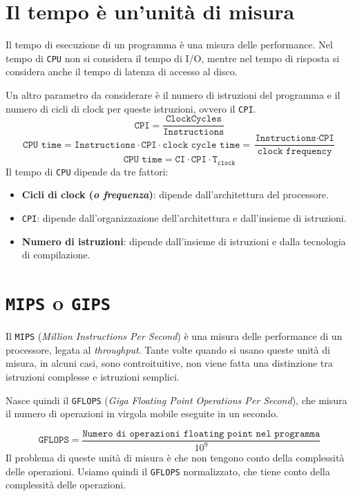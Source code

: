 \section{Il tempo è un'unità di misura}
Il tempo di esecuzione di un programma è una misura
delle performance. 
Nel tempo di \texttt{CPU} non si considera il tempo di
I/O, mentre nel tempo di risposta si considera anche il 
tempo di latenza di accesso al disco.

Un altro parametro da considerare è il numero di istruzioni
del programma e il numero di cicli di clock per queste istruzioni,
ovvero il \texttt{CPI}.
\[
  \texttt{CPI} = \frac{\texttt{ClockCycles}}{\texttt{Instructions}}  
\]
\[
  \texttt{CPU time} = \texttt{Instructions} \cdot \texttt{CPI} \cdot \texttt{clock cycle time}
  = \frac{\texttt{Instructions} \cdot \texttt{CPI}}{\texttt{clock frequency}}
\]
\[
  \texttt{CPU time} = \texttt{CI} \cdot \texttt{CPI} \cdot \texttt{T}_\texttt{clock}
\]
Il tempo di \texttt{CPU} dipende da tre fattori:
\begin{itemize}
  \item \textbf{Cicli di clock (\textit{o frequenza})}: dipende 
  dall'architettura del processore.
  \item \texttt{CPI}: dipende dall'organizzazione dell'architettura e 
  dall'insieme di istruzioni.
  \item \textbf{Numero di istruzioni}: dipende dall'insieme di istruzioni
  e dalla tecnologia di compilazione.
\end{itemize}
\section{\texttt{MIPS} o \texttt{GIPS}}
Il \texttt{MIPS} (\textit{Million Instructions Per Second}) è una
misura delle performance di un processore, legata al \textit{throughput}.
Tante volte quando si usano queste unità di misura, in alcuni casi, 
sono controituitive, non viene fatta una distinzione tra istruzioni complesse 
e istruzioni semplici.

Nasce quindi il \texttt{GFLOPS} (\textit{Giga Floating Point Operations Per Second}),
che misura il numero di operazioni in virgola mobile eseguite in un secondo.

\[
  \texttt{GFLOPS} = \frac{\texttt{Numero di operazioni floating point nel programma}}{10^9}
\]
Il problema di queste unità di misura è che non tengono conto
della complessità delle operazioni.
Usiamo quindi il \texttt{GFLOPS} normalizzato, che tiene conto
della complessità delle operazioni.